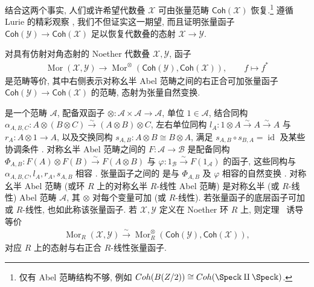 结合这两个事实, 人们或许希望代数叠 $\mathcal X$ 可由张量范畴 $\mathsf{Coh}(\mathcal X)$ 恢复.\footnote{仅有 Abel 范畴结构不够, 例如 $\mathsf{Coh}(B(\mathbb Z/2))\cong\mathsf{Coh}(\Spec\Bbbk\amalg\Spec\Bbbk)$.} 遵循 Lurie 的精彩观察 \cite{Lur04}, 我们不但证实这一期望, 而且证明张量函子 $\mathsf{Coh}(\mathcal Y)\to\mathsf{Coh}(\mathcal X)$ 足以恢复代数叠的态射 $\mathcal X\to\mathcal Y$.
\begin{theorem}[凝聚 Tannaka 对偶]\label{src:7.6.1}
对具有仿射对角态射的 Noether 代数叠 $\mathcal X,\mathcal Y$, 函子
\begin{align}\label{src:7.6.2}
\operatorname{Mor}(\mathcal X,\mathcal Y)\longrightarrow\operatorname{Mor}^{\otimes}(\mathsf{Coh}(\mathcal Y),\mathsf{Coh}(\mathcal X)),\qquad f\longmapsto f^*
\end{align}
是范畴等价, 其中右侧表示对称幺半 Abel 范畴之间的右正合可加张量函子 $\mathsf{Coh}(\mathcal Y)\to\mathsf{Coh}(\mathcal X)$ 的范畴, 态射为张量自然变换.
\end{theorem}
\begin{remark}\label{src:7.6.3}
 是一个范畴 $\mathcal A$, 配备双函子 $\otimes:\mathcal A\times\mathcal A\to\mathcal A$, 单位 $1\in\mathcal A$, 结合同构 $\alpha_{A,B,C}:A\otimes(B\otimes C)\xrightarrow{\sim}(A\otimes B)\otimes C$, 左右单位同构 $l_A:1\otimes A\xrightarrow{\sim}A\xrightarrow{\sim}A$ 与 $r_A:A\otimes1\to A$, 以及交换同构 $s_{A,B}:A\otimes B\cong B\otimes A$, 满足 $s_{A,B}\circ s_{B,A}=\operatorname{id}$ 及某些协调条件 \cite[\S XI.1]{Mac71}. 对称幺半 Abel 范畴之间的 $F:\mathcal A\to\mathcal B$ 是配备同构 $\Phi_{A,B}:F(A)\otimes F(B)\xrightarrow{\sim}F(A\otimes B)$ 与 $\varphi:1_{\mathcal B}\xrightarrow{\sim}F(1_{\mathcal A})$ 的函子, 这些同构与 $\alpha_{A,B,C},l_A,r_A,s_{A,B}$ 相容 \cite[\S XI.2]{Mac71}. 张量函子之间的 是与 $\Phi_{A,B}$ 及 $\varphi$ 相容的自然变换 \cite[\S XI.2]{Mac71}. 对称幺半 Abel 范畴 (或环 $R$ 上的对称幺半 $R$-线性 Abel 范畴) 是对称幺半 (或 $R$-线性) Abel 范畴 $\mathcal A$, 其 $\otimes$ 对每个变量可加 (或 $R$-线性). 若张量函子的底层函子可加或 $R$-线性, 也如此称该张量函子. 若 $\mathcal X,\mathcal Y$ 定义在 Noether 环 $R$ 上, 则定理~ 诱导等价
\begin{align*}
\operatorname{Mor}_R(\mathcal X,\mathcal Y)\xrightarrow{\sim}\operatorname{Mor}_R^{\otimes}(\mathsf{Coh}(\mathcal Y),\mathsf{Coh}(\mathcal X)),
\end{align*}
对应 $R$ 上的态射与右正合 $R$-线性张量函子.
\end{remark}

